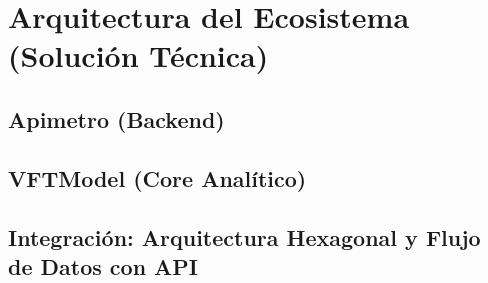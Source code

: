 \section{Arquitectura del Ecosistema (Solución Técnica)}
\label{section:arquitectura-ecosistema}
\lipsum[7-8]

\subsection{Apimetro (Backend)}
\label{subsection:apimetro-backend}

\lipsum[11]

\subsection{VFTModel (Core Analítico)}
\label{subsection:vftmodel-analitico}

\lipsum[11]

\subsection{Integración: Arquitectura Hexagonal y Flujo de Datos con API}
\label{subsection:arquitectura-hexagonal}

\lipsum[11]